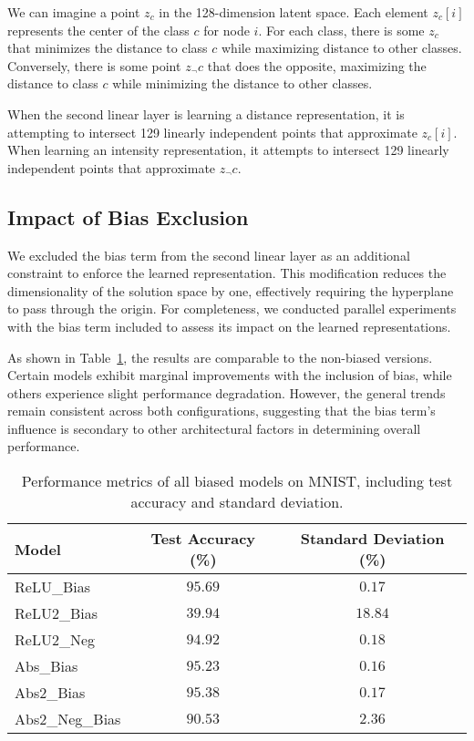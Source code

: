 We can imagine a point $z_c$ in the 128-dimension latent space. Each element $z_c[i]$ represents the center of the class $c$ for node $i$. For each class, there is some $z_c$ that minimizes the distance to class $c$ while maximizing distance to other classes. Conversely, there is some point $z_\neg c$ that does the opposite, maximizing the distance to class $c$ while minimizing the distance to other classes. 

When the second linear layer is learning a distance representation, it is attempting to intersect 129 linearly independent points that approximate $z_c[i]$. When learning an intensity representation, it attempts to intersect 129 linearly independent points that approximate $z_\neg c$.

\subsection{Impact of Bias Exclusion}

We excluded the bias term from the second linear layer as an additional constraint to enforce the learned representation. This modification reduces the dimensionality of the solution space by one, effectively requiring the hyperplane to pass through the origin. For completeness, we conducted parallel experiments with the bias term included to assess its impact on the learned representations.

As shown in Table~\ref{tab:biased_performance}, the results are comparable to the non-biased versions. Certain models exhibit marginal improvements with the inclusion of bias, while others experience slight performance degradation. However, the general trends remain consistent across both configurations, suggesting that the bias term's influence is secondary to other architectural factors in determining overall performance.

\begin{table}[ht]
    \centering
    \begin{tabular}{lcc}
    \toprule
    \textbf{Model} & \textbf{Test Accuracy (\%)} & \textbf{Standard Deviation (\%)} \\
    \midrule
    ReLU\_Bias & $95.69$ & $0.17$ \\
    ReLU2\_Bias & $39.94$ & $18.84$ \\
    ReLU2\_Neg & $94.92$ & $0.18$ \\
    Abs\_Bias & $95.23$ & $0.16$ \\
    Abs2\_Bias & $95.38$ & $0.17$ \\
    Abs2\_Neg\_Bias & $90.53$ & $2.36$ \\
    \bottomrule
    \end{tabular}
    \caption{Performance metrics of all biased models on MNIST, including test accuracy and standard deviation.}
    \label{tab:biased_performance}
\end{table}

